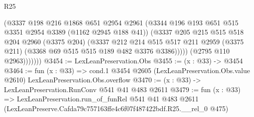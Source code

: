 \begin{lexlean}{R25}
\begin{coremodule}
                  (@3337
                    @198
                    @216
                    @1868
                    @651
                    @2954
                    @2961
                    (@3344 @196 @193 @651 @515 @3351 @2954 @3389 (@1162 @2945 @188 @41))
                    (@3337
                      @205
                      @215
                      @515
                      @518
                      @204
                      @2960
                      (@3375 @204)
                      (@3337
                        @212
                        @214
                        @515
                        @517
                        @211
                        @2959
                        (@3375 @211)
                        (@3368 @69 @515 @515 @189 @482 @3376 @3386)))))
                (@2795 @110 @2963)))))))
@3454 := LexLeanPreservation.Obs
@3455 := (x : @33) -> @3454
@3464 := fun (x : @33) =>
  cond.{1} @3454 @2605 (LexLeanPreservation.Obs.value @2610) LexLeanPreservation.Obs.overflow
@3470 := (x : @33) -> LexLeanPreservation.RunConv @541 @41 @483 @2611
@3479 := fun (x : @33) =>
  LexLeanPreservation.run_of_funRel
    @541
    @41
    @483
    @2611
    (LexLeanPreserve.Cafda79c757163ffe4c6f07f487422bdf.R25.__rel_0 @475)
\end{coremodule}
\end{lexlean}
